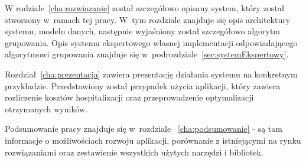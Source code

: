 W rodziale~\ref{cha:rozwiazanie} został szczegółowo opisany system, który został stworzony w~ramach tej pracy. W~tym rozdziale znajduje się opis architektury systemu, modelu danych, następnie wyjaśniony został szczegółowo algorytm grupowania. Opis systemu ekspertowego własnej implementacji odpowiadającego algorytmowi grupowania znajduje się w~podrozdziale~\ref{sec:systemEkspertowy}.

Rozdział~\ref{cha:prezentacja} zawiera prezentację działania systemu na konkretnym przykładzie. Przedstawiony został przypadek użycia aplikacji, który zawiera rozliczenie kosztów hospitalizacji oraz przeprowadzenie optymalizacji otrzymanych wyników.

Podsumowanie pracy znajduje się w~rozdziale ~\ref{cha:podsumowanie} - są tam informacje o możliwościach rozwoju aplikacji, porównanie z istniejącymi na rynku rozwiązaniami oraz zestawienie wszystkich użytych narzędzi i bibliotek.


